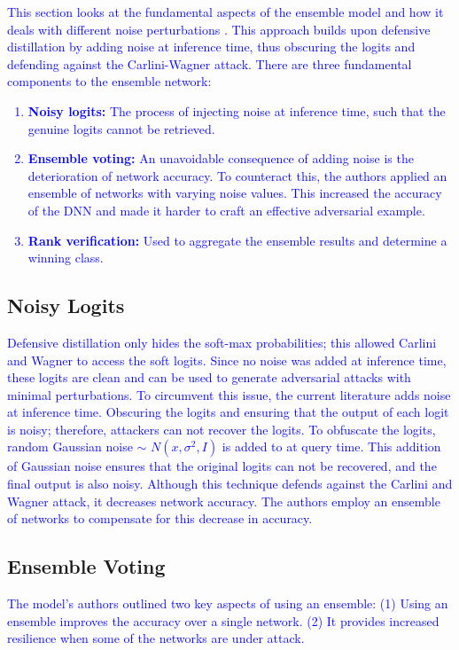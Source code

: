 \documentclass{article}
\begin{document}
\textcolor{blue}{
This section looks at the fundamental aspects of the ensemble model and how it deals with different noise perturbations \cite{reference1}. This approach builds upon defensive distillation \cite{reference7} by adding noise at inference time, thus obscuring the logits and defending against the Carlini-Wagner attack. There are three fundamental components to the ensemble network:
}
\textcolor{blue}{
\begin{enumerate}
    \item \textbf{Noisy logits:} The process of injecting noise at inference time, such that the genuine logits cannot be retrieved.
    \item \textbf{Ensemble voting:} An unavoidable consequence of adding noise is the deterioration of network accuracy. To counteract this, the authors applied an ensemble of networks with varying noise values. This increased the accuracy of the DNN and made it harder to craft an effective adversarial example.
    \item \textbf{Rank verification:} Used to aggregate the ensemble results and determine a winning class.
\end{enumerate}
}

\subsection{Noisy Logits}
\textcolor{blue}{
Defensive distillation only hides the soft-max probabilities; this allowed Carlini and Wagner to access the soft logits. Since no noise was added at inference time, these logits are clean and can be used to generate adversarial attacks with minimal perturbations. To circumvent this issue, the current literature \cite{reference1} adds noise at inference time. Obscuring the logits and ensuring that the output of each logit is noisy; therefore, attackers can not recover the logits.
To obfuscate the logits, random Gaussian noise \epsilon $ \sim $ \(N(x, \sigma^2, I)\) is added to at query time. This addition of Gaussian noise ensures that the original logits can not be recovered, and the final output is also noisy. Although this technique defends against the Carlini and Wagner attack, it decreases network accuracy. The authors employ an ensemble of networks to compensate for this decrease in accuracy.
}
\subsection{Ensemble Voting}
\textcolor{blue}{
The model's authors outlined two key aspects of using an ensemble: (1) Using an ensemble improves the accuracy over a single network. (2) It provides increased resilience when some of the networks are under attack.}
\end{document}

